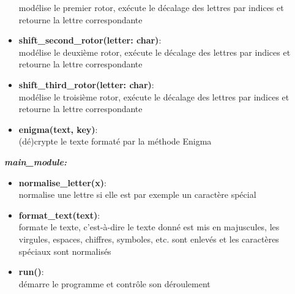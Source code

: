 \documentclass[a4paper,12pt,abstracton,titlepage]{scrartcl}
\begin{document}
\begin{itemize}
modélise le premier rotor, exécute le décalage des lettres par indices et retourne la lettre correspondante\\
\item \textbf{shift\_second\_rotor(letter: char)}:\\
modélise le deuxième rotor, exécute le décalage des lettres par indices et retourne la lettre correspondante\\
\item \textbf{shift\_third\_rotor(letter: char)}:\\
modélise le troisième rotor, exécute le décalage des lettres par indices et retourne la lettre correspondante\\
\item \textbf{enigma(text, key)}:\\
(dé)crypte le texte formaté par la méthode Enigma\\
\end{itemize}\vspace{0.3cm}


\textit{\textbf{main\_module:}}\vspace{0.2cm}
\begin{itemize}
\item \textbf{normalise\_letter(x)}:\\
normalise une lettre si elle est par exemple un caractère spécial\\
\item \textbf{format\_text(text)}:\\
formate le texte, c'est-à-dire le texte donné est mis en majuscules, les virgules, espaces, chiffres, symboles, etc. sont enlevés et les caractères spéciaux sont normalisés\\
\item \textbf{run()}:\\
démarre le programme et contrôle son déroulement\\
\end{itemize}\vspace{0.3cm}
\end{document}
